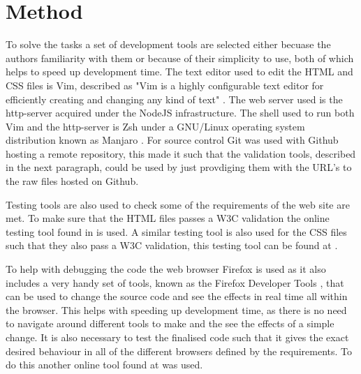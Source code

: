 \documentclass[a4paper]{scrartcl}
\begin{document}

\section{Method}

To solve the tasks a set of development tools are selected either becuase the authors familiarity with them or because of their simplicity to use, both of which helps to speed up development time. The text editor used to edit the HTML and CSS files is Vim, described as "Vim is a highly configurable text editor for efficiently creating and changing any kind of text" \citet{noauthor_welcome_nodate}. The web server used is the http-server \citet{noauthor_http-server_nodate} acquired under the NodeJS infrastructure. The shell used to run both Vim and the http-server is Zsh \citet{noauthor_zsh_nodate} under a GNU/Linux operating system distribution known as Manjaro \citet{noauthor_manjaro_nodate}. For source control Git was used with Github hosting a remote repository, this made it such that the validation tools, described in the next paragraph, could be used by just provdiging them with the URL's to the raw files hosted on Github.

Testing tools are also used to check some of the requirements of the web site are met. To make sure that the HTML files passes a W3C validation the online testing tool found in \citet{noauthor_w3c_nodate} is used. A similar testing tool is also used for the CSS files such that they also pass a W3C validation, this testing tool can be found at \citet{noauthor_w3c_nodate-1}.

To help with debugging the code the web browser Firefox is used as it also includes a very handy set of tools, known as the Firefox Developer Tools \citet{noauthor_firefox_nodate}, that can be used to change the source code and see the effects in real time all within the browser. This helps with speeding up development time, as there is no need to navigate around different tools to make and the see the effects of a simple change. It is also necessary to test the finalised code such that it gives the exact desired behaviour in all of the different browsers defined by the requirements. To do this another online tool found at \citet{online browser tester} was used.
\end{document}
